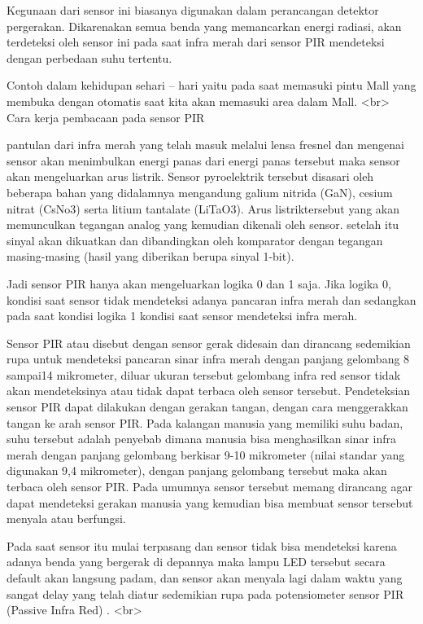 Kegunaan dari sensor ini biasanya digunakan dalam perancangan detektor pergerakan. Dikarenakan semua benda yang memancarkan energi radiasi, akan terdeteksi oleh sensor ini pada saat infra merah dari sensor PIR mendeteksi dengan perbedaan suhu tertentu.

Contoh dalam kehidupan sehari – hari yaitu pada saat memasuki pintu Mall yang membuka dengan otomatis saat kita akan memasuki area dalam Mall.
<br>
Cara kerja pembacaan pada sensor PIR

pantulan dari infra merah yang telah masuk melalui lensa fresnel dan mengenai sensor akan menimbulkan energi panas dari energi panas tersebut maka sensor akan mengeluarkan arus listrik.
Sensor pyroelektrik tersebut disasari oleh beberapa bahan yang didalamnya mengandung galium nitrida (GaN), cesium nitrat (CsNo3) serta litium tantalate (LiTaO3).
Arus listriktersebut yang akan memunculkan tegangan analog yang kemudian dikenali oleh sensor. setelah itu sinyal akan dikuatkan dan dibandingkan oleh komparator dengan tegangan masing-masing (hasil yang diberikan berupa sinyal 1-bit).

Jadi sensor PIR hanya akan mengeluarkan logika 0 dan 1 saja. Jika logika 0, kondisi saat sensor tidak mendeteksi adanya pancaran infra merah dan sedangkan pada saat kondisi logika 1 kondisi saat sensor mendeteksi infra merah.

Sensor PIR atau disebut dengan sensor gerak didesain dan dirancang sedemikian rupa untuk mendeteksi pancaran sinar infra merah dengan panjang gelombang 8 sampai14 mikrometer, diluar ukuran tersebut gelombang infra red sensor tidak akan mendeteksinya atau tidak dapat terbaca oleh sensor tersebut. Pendeteksian sensor PIR  dapat dilakukan dengan gerakan tangan, dengan cara menggerakkan tangan ke arah sensor PIR.
Pada kalangan manusia yang memiliki suhu badan, suhu tersebut adalah penyebab dimana manusia bisa menghasilkan sinar infra merah dengan panjang gelombang berkisar 9-10 mikrometer (nilai standar yang digunakan 9,4 mikrometer), dengan panjang gelombang tersebut maka akan terbaca oleh sensor PIR. Pada umumnya sensor tersebut memang dirancang agar dapat mendeteksi gerakan manusia yang kemudian bisa membuat sensor tersebut menyala atau berfungsi.

Pada saat sensor itu mulai terpasang dan sensor tidak bisa mendeteksi karena adanya benda yang bergerak di depannya maka lampu LED tersebut secara default akan langsung padam, dan sensor akan menyala lagi dalam waktu yang sangat delay yang telah diatur sedemikian rupa pada potensiometer sensor PIR (Passive Infra Red) .
<br>

